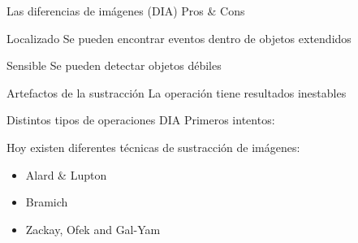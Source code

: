 \documentclass[11pt]{beamer}
\begin{document}
\begin{frame}{Las diferencias de im\'agenes (DIA)}
Pros \& Cons
   \begin{exampleblock}{Localizado}
   Se pueden encontrar eventos dentro de objetos extendidos
   \end{exampleblock}
   \pause
   \begin{exampleblock}{Sensible}
   Se pueden detectar objetos d\'ebiles
   \end{exampleblock}
   \pause
   \begin{alertblock}{Artefactos de la sustracci\'on}
   La operaci\'on tiene resultados inestables
   \end{alertblock}
   
\end{frame}

\begin{frame}{Distintos tipos de operaciones DIA}
    Primeros intentos: \cite{phillips_registering_1995}
    
    Hoy existen diferentes t\'ecnicas de sustracci\'on de im\'agenes:
    \begin{itemize}
        \item Alard \& Lupton \cite{alard_method_1998}
        \item Bramich \cite{bramich_new_2008}
        \item Zackay, Ofek and Gal-Yam \cite{zackay_proper_2016}
    \end{itemize}
\end{frame}
\end{document}
